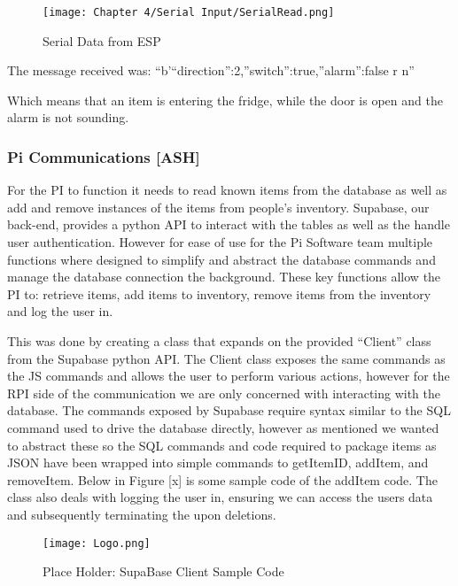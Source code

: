 \begin{figure}[H]        
    \centering
    \texttt{[image: Chapter 4/Serial Input/SerialRead.png]}
    \caption{Serial Data from ESP}
    \label{fig:rpiserial} 
\end{figure} 

The message received was: “b'{“direction”:2,”switch”:true,”alarm”:false} r n”

Which means that an item is entering the fridge, while the door is open and the alarm is not sounding.

\subsubsection{Pi Communications [ASH]}

For the PI to function it needs to read known items from the database as well as add and remove instances of the items from people's inventory.
Supabase, our back-end, provides a python API to interact with the tables as well as the handle user authentication.
However for ease of use for the Pi Software team multiple functions where designed to simplify and abstract the database commands and manage the database connection the background.
These key functions allow the PI to: retrieve items, add items to inventory, remove items from the inventory and log the user in.

This was done by creating a class that expands on the provided “Client” class from the Supabase python API.
The Client class exposes the same commands as the JS commands and allows the user to perform various actions, however for the RPI side of the communication we are only concerned with interacting with the database.
The commands exposed by Supabase require syntax similar to the SQL command used to drive the database directly, however as mentioned we wanted to abstract these so the SQL commands and code required to package items as JSON have been wrapped into simple commands to getItemID, addItem, and removeItem.
Below in Figure [x] is some sample code of the addItem code.
The class also deals with logging the user in, ensuring we can access the users data and subsequently terminating the upon deletions.

\begin{figure}[H]        
    \centering
    \texttt{[image: Logo.png]}
    \caption{Place Holder: SupaBase Client Sample Code}
    \label{fig:placeholder}
\end{figure} 

